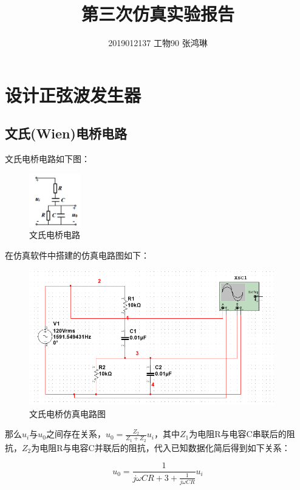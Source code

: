 \documentclass[UTF8]{ctexart}
\begin{document}
\title{第三次仿真实验报告}
\author{2019012137  工物90  张鸿琳}
\maketitle

\tableofcontents
\newpage
\section{设计正弦波发生器}
\subsection{文氏(Wien)电桥电路}
文氏电桥电路如下图：
\begin{figure}[H]
\centering
\includegraphics[width=0.2\textwidth]{A.png}
\caption{文氏电桥电路}
\end{figure}

在仿真软件中搭建的仿真电路图如下：
\begin{figure}[H]
\centering
\includegraphics[width=0.95\textwidth]{C.png}
\caption{文氏电桥仿真电路图}
\end{figure}

那么$u_i$与$u_0$之间存在关系，$u_0=\frac{Z_2}{Z_1+Z_2}u_i$，其中$Z_1$为电阻R与电容C串联后的阻抗，$Z_2$为电阻R与电容C并联后的阻抗，代入已知数据化简后得到如下关系：

\begin{equation}
u_0=\frac{1}{j\omega CR+3+\frac{1}{j\omega CR}}u_i
\end{equation}
\end{document}
